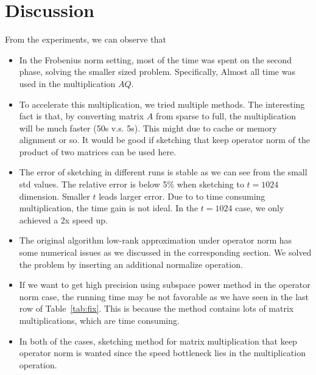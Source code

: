 \section{Discussion}

From the experiments,
we can observe that
\begin{itemize}
    \item In the Frobenius norm setting,
        most of the time was spent on the second phase,
        \ie solving the smaller sized problem.
        Specifically,
        Almost all time was used in the multiplication $AQ$.
    \item To accelerate this multiplication,
        we tried multiple methods.
        The interesting fact is that,
        by converting matrix $A$ from sparse to full,
        the multiplication will be much faster
        (50s v.s. 5s).
        This might due to cache or memory alignment or so.
        It would be good if sketching
        that keep operator norm of the product of two matrices
        can be used here.
    \item The error of sketching in different runs is stable
        as we can see from the small std values.
        The relative error is below 5\% when sketching to
        $t=1024$ dimension.
        Smaller $t$ leads larger error.
        Due to to time consuming multiplication,
        the time gain is not ideal.
        In the $t=1024$ case,
        we only achieved a 2x speed up.
    \item The original algorithm low-rank approximation under operator norm
        has some numerical issues as we discussed in the corresponding section.
        We solved the problem by inserting an additional normalize operation.
    \item If we want to get high precision using subspace power method
        in the operator norm case, the running time may be not favorable
        as we have seen in the last row of Table~\ref{tab:fix}.
        This is because the method contains lots of matrix multiplications,
        which are time consuming.
    \item In both of the cases,
        sketching method for matrix multiplication that keep operator norm
        is wanted since the speed bottleneck lies in
        the multiplication operation.
\end{itemize}
